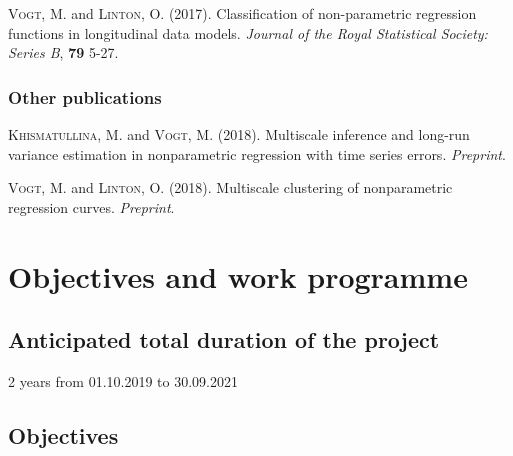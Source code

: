 \documentclass[a4paper,12pt]{article}
\begin{document}
\begin{itemize}[label=--,leftmargin=0.5cm]
\hangindent=0.4cm \textsc{Vogt}, M. and \textsc{Linton}, O. (2017). Classification of non-parametric regression functions in longitudinal data models. \textit{Journal of the Royal Statistical Society: Series B}, \textbf{79} 5-27.


\subsubsection{Other publications}

\hangindent=0.4cm \textsc{Khismatullina}, M. and \textsc{Vogt}, M. (2018). Multiscale inference and long-run variance estimation in nonparametric regression with time series errors. \textit{Preprint}.

\vspace{5pt}

\noindent \hangindent=0.4cm \textsc{Vogt}, M. and \textsc{Linton}, O. (2018). Multiscale clustering of nonparametric regression curves. \textit{Preprint}. 



\section{Objectives and work programme}


\subsection{Anticipated total duration of the project}


2 years from 01.10.2019 to 30.09.2021


\subsection{Objectives}



\end{itemize}
\end{document}
